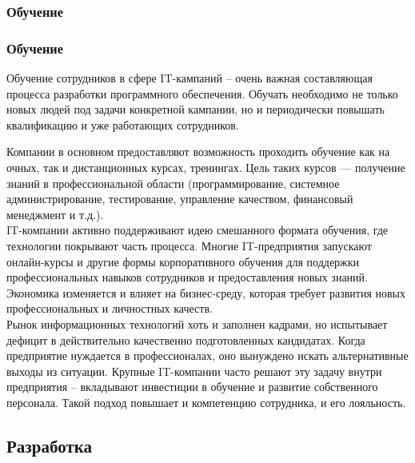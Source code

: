 \documentclass{../industrial-development}
\begin{document}
\subsubsection{Обучение}
\begin{frame} \frametitle{Обучение}
Обучение сотрудников в сфере IT-кампаний – очень важная составляющая процесса разработки программного обеспечения. Обучать необходимо не только новых людей под задачи конкретной кампании, но и периодически повышать квалификацию и уже работающих сотрудников.
\end{frame}
\lecturenotes
Компании в основном предоставляют возможность проходить обучение как на очных, так и дистанционных курсах, тренингах. Цель таких курсов — получение знаний в профессиональной области (программирование, системное администрирование, тестирование, управление качеством, финансовый менеджмент и т.д.).\\
IT-компании активно поддерживают идею смешанного формата обучения, где технологии покрывают часть процесса. Многие IT-предприятия запускают онлайн-курсы и другие формы корпоративного обучения для поддержки профессиональных навыков сотрудников и предоставления новых знаний. Экономика изменяется и влияет на бизнес-среду, которая требует развития новых профессиональных и личностных качеств.\\
Рынок информационных технологий хоть и заполнен кадрами, но испытывает дефицит в действительно качественно подготовленных кандидатах. Когда предприятие нуждается в профессионалах, оно вынуждено искать альтернативные выходы из ситуации. Крупные IT-компании часто решают эту задачу внутри предприятия – вкладывают инвестиции в обучение и развитие собственного персонала. Такой подход повышает и компетенцию сотрудника, и его лояльность.


\subsection{Разработка}
\end{document}
